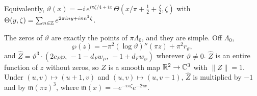 Equivalently, $\vartheta(x)=-i\,e^{i\pi\zeta/4+ix}\,\Theta(x/\pi+\frac12+\frac\zeta2,\zeta)$ with
$\Theta(y,\zeta)=\sum_{n\in\mathbb{Z}}e^{2\pi iny+i\pi n^2\zeta}$.

\begin{lemma}\label{lem:fer-theta}
The zeros of $\vartheta$ are exactly the points of $\pi\Lambda_0$, and they are simple. Off $\Lambda_0$,
\[
 \wp(z)=-\pi^2(\log\vartheta)''(\pi z)+\pi^2r_\vartheta ,
\]
and $\hat Z=\vartheta^3\cdot(2c_F\wp,\,-1-d_Fw_\wp,\,-1+d_Fw_\wp)$ wherever $\vartheta\ne0$. $\hat Z$ is an entire function
of $z$ without zeros, so $Z$ is a smooth map $\mathbb{R}^2\to\mathbb{C}^3$ with $\|Z\|=1$. Under $(u,v)\mapsto(u+1,v)$ and
$(u,v)\mapsto(u,v+1)$, $\hat Z$ is multiplied by $-1$ and by $\mathfrak m(\pi z)^3$, where
$\mathfrak m(x)=-e^{-i\pi\zeta}e^{-2ix}$.
\end{lemma}

